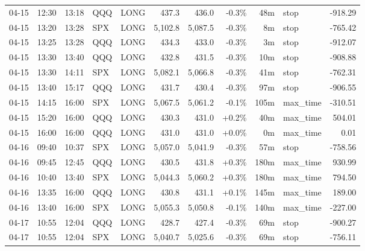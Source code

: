 \documentclass[11pt,a4paper,twoside]{article}
\begin{document}
\begin{center}
\begin{longtable}{>{\color{txtmain}}l l l l l r r r r >{\color{txtmain}}l r}
04-15 & 12:30 & 13:18 & QQQ & LONG & 437.3 & 436.0 & \textcolor{lossred}{-0.3\%} & 48m & stop & \textcolor{lossred}{-918.29} \\
04-15 & 13:20 & 13:28 & SPX & LONG & 5,102.8 & 5,087.5 & \textcolor{lossred}{-0.3\%} & 8m & stop & \textcolor{lossred}{-765.42} \\
04-15 & 13:25 & 13:28 & QQQ & LONG & 434.3 & 433.0 & \textcolor{lossred}{-0.3\%} & 3m & stop & \textcolor{lossred}{-912.07} \\
04-15 & 13:30 & 13:40 & QQQ & LONG & 432.8 & 431.5 & \textcolor{lossred}{-0.3\%} & 10m & stop & \textcolor{lossred}{-908.88} \\
04-15 & 13:30 & 14:11 & SPX & LONG & 5,082.1 & 5,066.8 & \textcolor{lossred}{-0.3\%} & 41m & stop & \textcolor{lossred}{-762.31} \\
04-15 & 13:40 & 15:17 & QQQ & LONG & 431.7 & 430.4 & \textcolor{lossred}{-0.3\%} & 97m & stop & \textcolor{lossred}{-906.55} \\
04-15 & 14:15 & 16:00 & SPX & LONG & 5,067.5 & 5,061.2 & \textcolor{lossred}{-0.1\%} & 105m & max\_time & \textcolor{lossred}{-310.51} \\
04-15 & 15:20 & 16:00 & QQQ & LONG & 430.3 & 431.0 & \textcolor{wingreen}{+0.2\%} & 40m & max\_time & \textcolor{wingreen}{504.01} \\
04-15 & 16:00 & 16:00 & QQQ & LONG & 431.0 & 431.0 & \textcolor{wingreen}{+0.0\%} & 0m & max\_time & \textcolor{wingreen}{0.01} \\
04-16 & 09:40 & 10:37 & SPX & LONG & 5,057.0 & 5,041.9 & \textcolor{lossred}{-0.3\%} & 57m & stop & \textcolor{lossred}{-758.56} \\
04-16 & 09:45 & 12:45 & QQQ & LONG & 430.5 & 431.8 & \textcolor{wingreen}{+0.3\%} & 180m & max\_time & \textcolor{wingreen}{930.99} \\
04-16 & 10:40 & 13:40 & SPX & LONG & 5,044.3 & 5,060.2 & \textcolor{wingreen}{+0.3\%} & 180m & max\_time & \textcolor{wingreen}{794.50} \\
04-16 & 13:35 & 16:00 & QQQ & LONG & 430.8 & 431.1 & \textcolor{wingreen}{+0.1\%} & 145m & max\_time & \textcolor{wingreen}{189.00} \\
04-16 & 13:40 & 16:00 & SPX & LONG & 5,055.3 & 5,050.8 & \textcolor{lossred}{-0.1\%} & 140m & max\_time & \textcolor{lossred}{-227.00} \\
04-17 & 10:55 & 12:04 & QQQ & LONG & 428.7 & 427.4 & \textcolor{lossred}{-0.3\%} & 69m & stop & \textcolor{lossred}{-900.27} \\
04-17 & 10:55 & 12:04 & SPX & LONG & 5,040.7 & 5,025.6 & \textcolor{lossred}{-0.3\%} & 69m & stop & \textcolor{lossred}{-756.11} \\

\end{longtable}
\end{center}
\end{document}
